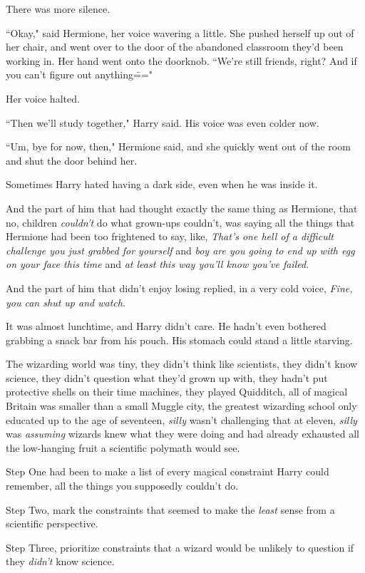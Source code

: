 There was more silence.

``Okay," said Hermione, her voice wavering a little. She pushed herself up out of her chair, and went over to the door of the abandoned classroom they'd been working in. Her hand went onto the doorknob. ``We're still friends, right? And if you can't figure out anything\==="

Her voice halted.

``Then we'll study together," Harry said. His voice was even colder now.

``Um, bye for now, then," Hermione said, and she quickly went out of the room and shut the door behind her.

Sometimes Harry hated having a dark side, even when he was inside it.

And the part of him that had thought exactly the same thing as Hermione, that no, children \emph{couldn't} do what grown-ups couldn't, was saying all the things that Hermione had been too frightened to say, like, \emph{That's one hell of a difficult challenge you just grabbed for yourself} and \emph{boy are you going to end up with egg on your face this time} and \emph{at least this way you'll know you've failed.}

And the part of him that didn't enjoy losing replied, in a very cold voice, \emph{Fine, you can shut up and watch.}

\later

It was almost lunchtime, and Harry didn't care. He hadn't even bothered grabbing a snack bar from his pouch. His stomach could stand a little starving.

The wizarding world was tiny, they didn't think like scientists, they didn't know science, they didn't question what they'd grown up with, they hadn't put protective shells on their time machines, they played Quidditch, all of magical Britain was smaller than a small Muggle city, the greatest wizarding school only educated up to the age of seventeen, \emph{silly} wasn't challenging that at eleven, \emph{silly} was \emph{assuming} wizards knew what they were doing and had already exhausted all the low-hanging fruit a scientific polymath would see.

Step One had been to make a list of every magical constraint Harry could remember, all the things you supposedly couldn't do.

Step Two, mark the constraints that seemed to make the \emph{least} sense from a scientific perspective.

Step Three, prioritize constraints that a wizard would be unlikely to question if they \emph{didn't} know science.

